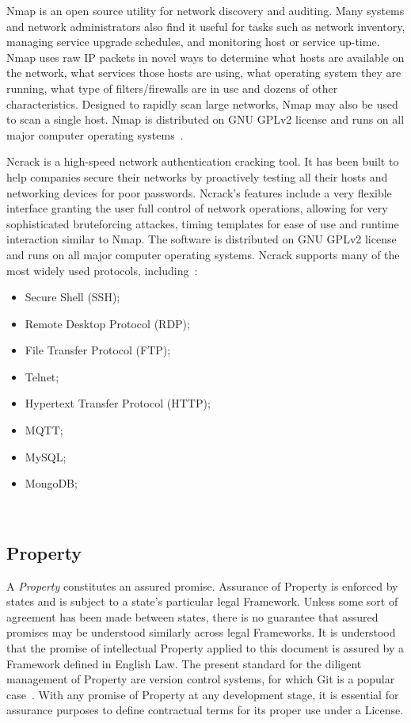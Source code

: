 \documentclass[11pt, oneside]{article}   	%
\begin{document}
Nmap is an open source utility for network discovery and auditing.
Many systems and network administrators also find it useful for tasks such as network inventory, managing service upgrade schedules, and monitoring host or service up-time.
Nmap uses raw IP packets in novel ways to determine what hosts are available on the network, what services those hosts are using, what operating system they are running, what type of filters/firewalls are in use and dozens of other characteristics.
Designed to rapidly scan large networks, Nmap may also be used to scan a single host.
Nmap is distributed on GNU GPLv2 license and runs on all major computer operating systems~\cite{nmap}.\

Ncrack is a high-speed network authentication cracking tool.
It has been built to help companies secure their networks by proactively testing all their hosts and networking devices for poor passwords.
Ncrack's features include a very flexible interface granting the user full control of network operations, allowing for very sophisticated bruteforcing attackes, timing templates for ease of use and runtime interaction similar to Nmap.
The software is distributed on GNU GPLv2 license and runs on all major computer operating systems.
Ncrack supports many of the most widely used protocols, including~\cite{ncrack}:
\begin{itemize}
	\item Secure Shell (SSH);
	\item Remote Desktop Protocol (RDP);
	\item File Transfer Protocol (FTP);
	\item Telnet;
	\item Hypertext Transfer Protocol (HTTP);
	\item MQTT;
	\item MySQL;
	\item MongoDB;
\end{itemize}\

\subsection{Property}
A \emph{Property} constitutes an assured promise.
Assurance of Property is enforced by states and is subject to a state's particular legal Framework.
Unless some sort of agreement has been made between states, there is no guarantee that assured promises may be understood similarly across legal Frameworks.
It is understood that the promise of intellectual Property applied to this document is assured by a Framework defined in English Law.
The present standard for the diligent management of Property are version control systems, for which Git is a popular case~\cite{git}.
With any promise of Property at any development stage, it is essential for assurance purposes to define contractual terms for its proper use under a License.
\end{document}
